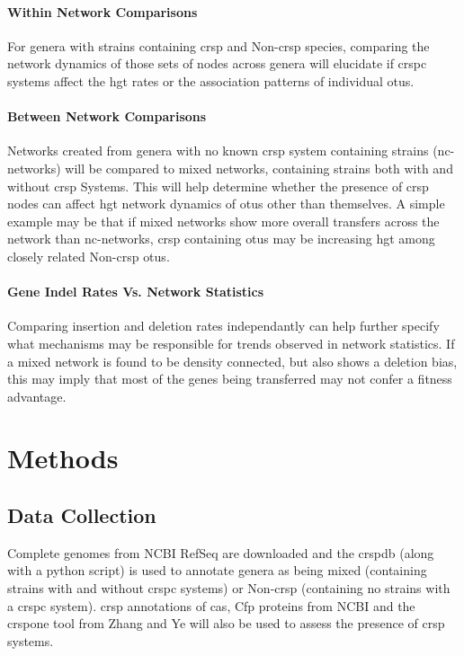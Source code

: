 \documentclass[12pt,letter]{article}
\begin{document}
\paragraph*{Within Network Comparisons}%
For genera with strains containing \ac{crsp} and Non-\ac{crsp} species, comparing the network dynamics of those sets of nodes across genera will elucidate if \ac{crspc} systems affect the \ac{hgt} rates or the association patterns of individual \ac{otu}s.
\paragraph*{Between Network Comparisons}%
Networks created from genera with no known \ac{crsp} system containing strains (nc-networks) will be compared to mixed networks, containing strains both with and without \ac{crsp} Systems.
This will help determine whether the presence of \ac{crsp} nodes can affect \ac{hgt} network dynamics of \ac{otu}s other than themselves.
A simple example may be that if mixed networks show more overall transfers across the network than nc-networks, \ac{crsp} containing \ac{otu}s may be increasing \ac{hgt} among closely related Non-\ac{crsp} \ac{otu}s.
\paragraph*{Gene Indel Rates Vs. Network Statistics}%
Comparing insertion and  deletion rates independantly can help further specify what mechanisms may be responsible for trends observed in network statistics.
If a mixed network is found to be density connected, but also shows a deletion bias, this may imply that most of the genes being transferred may not confer a fitness advantage.
\section*{\huge Methods}
\subsection*{Data Collection}
Complete genomes from NCBI RefSeq are downloaded and the \ac{crsp}db (along with a python script) is used to annotate genera as being mixed (containing strains with and without \ac{crspc} systems) or Non-\ac{crsp} (containing no strains with a \ac{crspc} system)\citep{crispdb}.
\ac{crsp} annotations of \ac{cas}, Cfp proteins from NCBI and the \ac{crsp}one tool from Zhang and Ye will also be used to assess the presence of \ac{crsp} systems\citep{ineqcas}.
\end{document}
